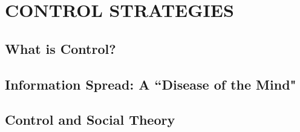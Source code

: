 \chapter{CONTROL STRATEGIES}

\section{What is Control?}

\section{Information Spread: A ``Disease of the Mind"}

\section{Control and Social Theory}